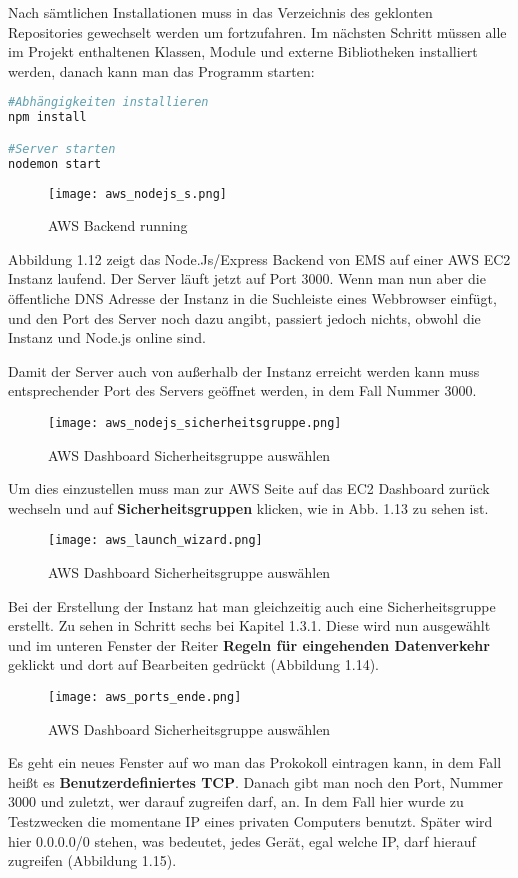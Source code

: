 Nach sämtlichen Installationen muss in das Verzeichnis des geklonten Repositories gewechselt werden um fortzufahren.
Im nächsten Schritt müssen alle im Projekt enthaltenen Klassen, Module und externe Bibliotheken installiert werden, danach kann man das Programm starten:
\begin{lstlisting}[language=bash]
#Abhängigkeiten installieren
npm install

#Server starten
nodemon start
\end{lstlisting}
\begin{center}
\begin{figure}[H]
    \centering
    \texttt{[image: aws\_nodejs\_s.png]}
    \caption{AWS Backend running}
\end{figure}
\end{center}
Abbildung 1.12 zeigt das Node.Js/Express Backend von EMS auf einer AWS EC2 Instanz laufend. 
Der Server läuft jetzt auf Port 3000. 
Wenn man nun aber die öffentliche DNS Adresse der Instanz in die Suchleiste eines Webbrowser einfügt, und den Port des Server noch dazu angibt, passiert jedoch nichts,
obwohl die Instanz und Node.js online sind.

Damit der Server auch von außerhalb der Instanz erreicht werden kann muss entsprechender Port des Servers geöffnet werden, in dem Fall Nummer 3000.
\begin{center}
\begin{figure}[h]
    \centering
    \texttt{[image: aws\_nodejs\_sicherheitsgruppe.png]}
    \caption{AWS Dashboard Sicherheitsgruppe auswählen}
\end{figure}
\end{center}
Um dies einzustellen muss man zur AWS Seite auf das EC2 Dashboard zurück wechseln und auf \textbf{Sicherheitsgruppen} klicken, wie in Abb. 1.13 zu sehen ist. 
\begin{center}
\begin{figure}[H]
    \centering
    \texttt{[image: aws\_launch\_wizard.png]}
    \caption{AWS Dashboard Sicherheitsgruppe auswählen}
\end{figure}
\end{center}
Bei der Erstellung der Instanz hat man gleichzeitig auch eine Sicherheitsgruppe erstellt. Zu sehen in Schritt sechs bei Kapitel 1.3.1.
Diese wird nun ausgewählt und im unteren Fenster der Reiter \textbf{Regeln für eingehenden Datenverkehr} geklickt und dort auf Bearbeiten gedrückt (Abbildung 1.14).
\begin{center}
\begin{figure}[h]
    \centering
    \texttt{[image: aws\_ports\_ende.png]}
    \caption{AWS Dashboard Sicherheitsgruppe auswählen}
\end{figure}
\end{center}
Es geht ein neues Fenster auf wo man das Prokokoll eintragen kann, in dem Fall heißt es \textbf{Benutzerdefiniertes TCP}. Danach gibt man noch den Port, Nummer 3000 und zuletzt, wer darauf zugreifen darf, an. In dem Fall hier
wurde zu Testzwecken die momentane IP eines privaten Computers benutzt. Später wird hier 0.0.0.0/0 stehen, was bedeutet, jedes Gerät, egal welche IP, darf hierauf zugreifen (Abbildung 1.15). 

